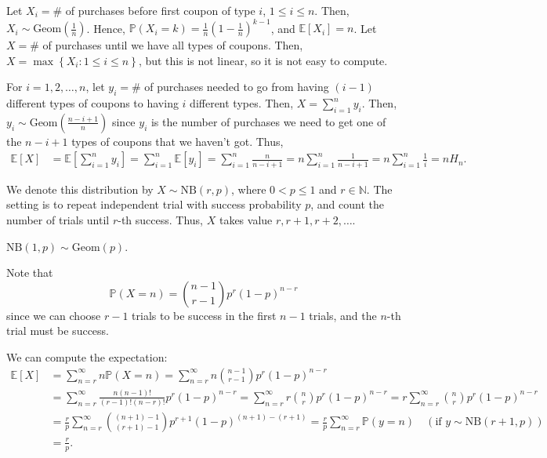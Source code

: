 \begin{explanation}
    Let \(X_i = \#\) of purchases before first coupon of type \(i\), \(1 \le i \le n\). Then, \(X_i \sim \mathrm{Geom}(\frac{1}{n}) \). Hence, \(\mathbb{P} (X_i = k) = \frac{1}{n} \left( 1 - \frac{1}{n} \right)^{k-1} \), and \(\mathbb{E} [X_i] = n\). Let \(X = \#\) of purchases until we have all types of coupons. Then, \(X = \max \left\{ X_i: 1 \le i \le n \right\} \), but this is not linear, so it is not easy to compute. 
    
    For \(i = 1, 2, \dots , n\), let \(y_i = \#\) of purchases needed to go from having \((i - 1)\) different types of coupons to having \(i\) different types. Then, \(X = \sum_{i=1}^n y_i \). Then, \(y_i \sim \mathrm{Geom}\left( \frac{n-i+1}{n} \right)  \) since \(y_i\) is the number of purchases we need to get one of the \(n - i + 1\) types of coupons that we haven't got. Thus,
    \begin{align*}
        \mathbb{E} [X] &= \mathbb{E} \left[ \sum_{i=1}^n y_i  \right] = \sum_{i=1}^n \mathbb{E} [y_i] = \sum_{i=1}^n \frac{n}{n - i + 1} = n \sum_{i=1}^n \frac{1}{n - i + 1} = n \sum_{i=1}^n \frac{1}{i} = n H_n.     
    \end{align*}               
\end{explanation}

\begin{definition}
    We denote this distribution by \(X \sim \mathrm{NB}(r, p) \), where \(0 < p \le 1\) and \(r \in \mathbb{N} \). The setting is to repeat independent trial with success probability \(p\), and count the number of trials until \(r\)-th success. Thus, \(X\) takes value \(r, r+1, r+2, \dots \).       
\end{definition}

\begin{observation}
    \(\mathrm{NB}(1, p) \sim \mathrm{Geom}(p) \).  
\end{observation}

Note that 
\[
    \mathbb{P} (X = n) = \binom{n - 1}{r - 1} p^r (1 - p)^{n - r}    
\]
since we can choose \(r - 1\) trials to be success in the first \(n - 1\) trials, and the \(n\)-th trial must be success. 

We can compute the expectation:
\begin{align*}
    \mathbb{E} [X] &= \sum_{n=r}^{\infty} n \mathbb{P} (X = n) = \sum_{n=r}^{\infty} n \binom{n-1}{r-1} p^r (1 - p)^{n - r} \\
    &= \sum_{n=r}^{\infty} \frac{n(n-1)!}{(r-1)!(n-r)!} p^r (1 - p)^{n - r} = \sum_{n=r}^{\infty} r \binom{n}{r} p^r (1-p)^{n-r} = r \sum_{n=r}^{\infty} \binom{n}{r} p^r (1-p)^{n-r} \\
    &= \frac{r}{p} \sum_{n=r}^{\infty} \binom{(n+1)-1}{(r+1)-1} p^{r+1} (1-p)^{(n+1)-(r+1)} = \frac{r}{p} \sum_{n=r}^{\infty} \mathbb{P} (y = n) \quad (\text{if } y \sim \mathrm{NB}(r+1, p)) \\
    &= \frac{r}{p}.        
\end{align*}

